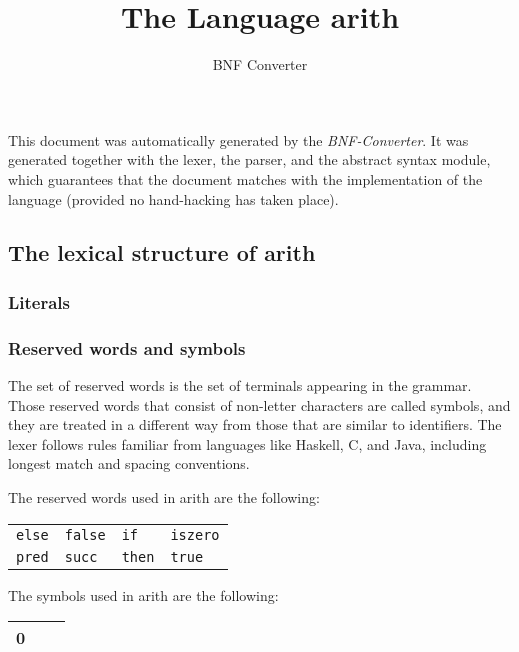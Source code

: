 \documentclass{article}
\title{The Language arith}
\author{BNF Converter}
\begin{document}
\maketitle
\clearpage


This document was automatically generated by the \textit{BNF-Converter}. It was generated together with the lexer, the parser, and the abstract syntax module, which guarantees that the document matches with the implementation of the language (provided no hand-hacking has taken place).

\subsection*{The lexical structure of arith}

\subsubsection*{Literals}

\subsubsection*{Reserved words and symbols}

The set of reserved words is the set of terminals appearing in the grammar. Those reserved words that consist of non-letter characters are called symbols, and they are treated in a different way from those that are similar to identifiers. The lexer follows rules familiar from languages like Haskell, C, and Java, including longest match and spacing conventions.

The reserved words used in arith are the following:

\begin{center}\begin{tabular}{llll}
\texttt{else} & \texttt{false} & \texttt{if} & \texttt{iszero} \\
\texttt{pred} & \texttt{succ} & \texttt{then} & \texttt{true} \\
\end{tabular}\end{center}

The symbols used in arith are the following:

\begin{center}\begin{tabular}{|l|l|l|}
\hline 0 &  &  \\
\hline \end{tabular}\end{center}
\end{document}
